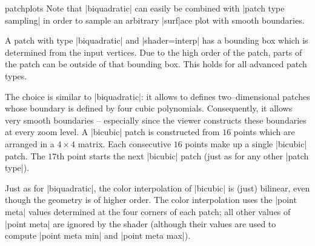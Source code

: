 {\begin{pgfplotslibrary}{patchplots}
	Note that |biquadratic| can easily be combined with |patch type sampling| in order to sample an arbitrary |surf|ace plot with smooth boundaries.

	A patch with type |biquadratic| and |shader=interp| has a bounding box which is determined from the input vertices. Due to the high order of the patch, parts of the patch can be outside of that bounding box. This holds for all advanced patch types.

	The choice  is similar to |biquadratic|: it allows to defines two--dimensional patches whose boundary is defined by four cubic polynomials. Consequently, it allows very smooth boundaries -- especially since the viewer constructs these boundaries at every zoom level. A |bicubic| patch is constructed from $16$ points which are arranged in a $4\times4$ matrix. Each consecutive $16$ points make up a single |bicubic| patch. The $17$th point starts the next |bicubic| patch (just as for any other |patch type|).
\begin{codeexample}[]
\end{codeexample}
	Just as for |biquadratic|, the color interpolation of |bicubic| is (just) bilinear, even though the geometry is of higher order. The color interpolation uses the |point meta| values determined at the four corners of each patch; all other values of |point meta| are ignored by the shader (although their values are used to compute |point meta min| and |point meta max|).
\begin{codeexample}[]
\end{codeexample}
\end{pgfplotslibrary}}
